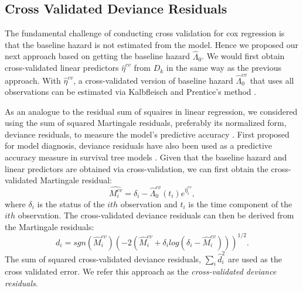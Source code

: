   \subsection{Cross Validated Deviance Residuals}

The fundamental challenge of conducting cross validation for cox regression is that the baseline hazard is not estimated from the model. Hence we proposed our next approach based on getting the baseline hazard $\hat{\Lambda}_{0}$. We would first obtain cross-validated linear predictors $\hat{\eta}^{cv}$ from $D_k$ in the same way as the previous approach. With $\hat{\eta}^{cv}$,  a cross-validated version of baseline hazard $\hat{\Lambda}^{cv}_{0}$ that uses all observations can be estimated via Kalbfleisch and Prentice's method \citep{Kalbfleisch2011}.

As an analogue to the residual sum of squaires in linear regression, we considered using the sum of squared Martingale residuals, preferably its normalized form, deviance residuals, to measure the model's predictive accuracy \citep{Therneau1990}. First proposed for model diagnosis, deviance residuals have also been used as a predictive accuracy measure in survival tree models \citep{Therneau2018}. Given that the baseline hazard and linear predictors are obtained via cross-validation, we can first obtain the cross-validated Martingale residual: 
	\begin{equation}
	\hat{M^{cv}_{i}} = \delta_{i} -\hat{\Lambda}^{cv}_{0}(t_{i})e^{\hat{\eta}^{cv}_{i}},
	\end{equation} 
where $\delta_{i}$ is the status of the $ith$ observation and $t_{i}$ is the time component of the $ith$ observation. The cross-validated deviance residuals can then be derived from the Martingale residuals: 
	\begin{equation} 
	d_{i} = sgn(\hat{M}^{cv}_{i})(-2(\hat{M}^{cv}_{i} + \delta_{i}log(\delta_{i} - \hat{M}^{cv}_{i})))^{1/2}.
	\end{equation}
The sum of squared cross-validated deviance residuals, $\sum_{i}\hat{d}_{i}^2$ are used as the cross validated error. We refer this approach as the \emph{cross-validated deviance residuals}.

